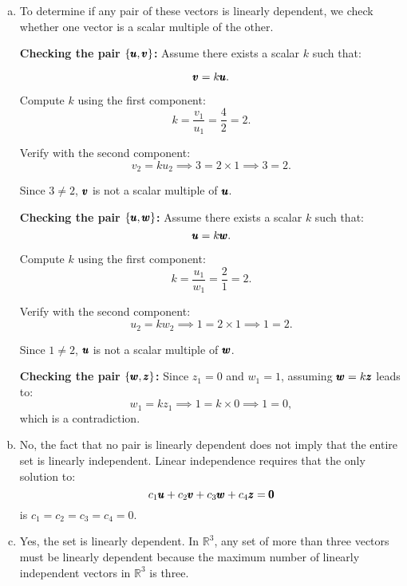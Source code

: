 \begin{solution}
    \begin{enumerate}[(a)]
        \item 
        To determine if any pair of these vectors is linearly dependent, we check whether one vector is a scalar multiple of the other.

        \textbf{Checking the pair $\{\pmb{u}, \pmb{v}\}$:} Assume there exists a scalar $k$ such that:
    
        \[
        \pmb{v} = k \pmb{u}.
        \]
        
        Compute $k$ using the first component:
        \[
        k = \dfrac{v_1}{u_1} = \dfrac{4}{2} = 2.
        \]
        
        Verify with the second component:
        \[
        v_2 = k u_2 \implies 3 = 2 \times 1 \implies 3 = 2.
        \]
        
        Since $3 \ne 2$, $\pmb{v}$ is not a scalar multiple of $\pmb{u}$.
        
        \textbf{Checking the pair $\{\pmb{u}, \pmb{w}\}$:} Assume there exists a scalar $k$ such that:
        \[
        \pmb{u} = k \pmb{w}.
        \]
        
        Compute $k$ using the first component:
        \[
        k = \dfrac{u_1}{w_1} = \dfrac{2}{1} = 2.
        \]
        
        Verify with the second component:
        \[
        u_2 = k w_2 \implies 1 = 2 \times 1 \implies 1 = 2.
        \]
        
        Since $1 \ne 2$, $\pmb{u}$ is not a scalar multiple of $\pmb{w}$.
        
        \textbf{Checking the pair $\{\pmb{w}, \pmb{z}\}$:} Since $z_1 = 0$ and $w_1 = 1$, assuming $\pmb{w} = k \pmb{z}$ leads to:
        \[
        w_1 = k z_1 \implies 1 = k \times 0 \implies 1 = 0,
        \] which is a contradiction.
    
        \item No, the fact that no pair is linearly dependent does not imply that the entire set is linearly independent. Linear independence requires that the only solution to:
        \[
        c_1 \pmb{u} + c_2 \pmb{v} + c_3 \pmb{w} + c_4 \pmb{z} = \pmb{0}
        \]
        is $c_1 = c_2 = c_3 = c_4 = 0$.
        
        \item Yes, the set is linearly dependent. In $\mathbb{R}^3$, any set of more than three vectors must be linearly dependent because the maximum number of linearly independent vectors in $\mathbb{R}^3$ is three.
    \end{enumerate}
        

\end{solution}
